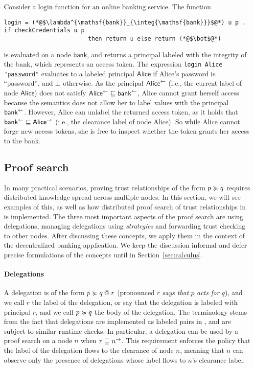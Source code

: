 Consider a login function for an online banking service. The function
\begin{lstlisting}
login = (*@$\lambda^{\mathsf{bank}}_{\integ{\mathsf{bank}}}$@*) u p . if checkCredentials u p
                        then return u else return (*@$\bot$@*)
\end{lstlisting}
is evaluated on a node $\mathsf{bank}$, and returns a principal labeled with the integrity of the bank, which represents an access token. The expression \lstinline[mathescape]!login Alice "password"! evaluates to a labeled principal $\mathsf{Alice}$ if Alice's password is ``password'', and $\bot$ otherwise. As the principal $\integ{\mathsf{Alice}}$ (i.e., the current label of node $\mathsf{Alice}$) does not satisfy $\integ{\mathsf{Alice}} \flowsto \integ{\mathsf{bank}}$, Alice cannot grant herself access because the semantics does not allow her to label values with the principal $\integ{\mathsf{bank}}$.
However, Alice can unlabel the returned access token, as it holds that $\integ{\mathsf{bank}} \flowsto \conf{\mathsf{Alice}}$ (i.e., the clearance label of node Alice). So while Alice cannot forge new access tokens, she is free to inspect whether the token grants her access to the bank.

\subsection{Proof search}
In many practical scenarios, proving trust relationships of the form $p \actsfor q$ requires distributed knowledge spread across multiple nodes. In this section, we will see examples of this, as well as how distributed proof search of trust relationships in \lang{} is implemented. The three most important aspects of the proof search are using delegations, managing delegations using \emph{strategies} and forwarding trust checking to other nodes. After discussing these concepts, we apply them in the context of the decentralized banking application. We keep the discussion informal and defer precise formulations of the concepts until in Section~\ref{sec:calculus}.

\paragraph{Delegations}
A delegation is of the form $\lb{r}{p \actsfor q}$ (pronounced $r$ \emph{says that} $p$ \emph{acts for} $q$), and we call $r$ the label of the delegation, or say that the delegation is labeled with principal $r$, and we call $p \actsfor q$ the body of the delegation. The terminology stems from the fact that delegations are implemented as labeled pairs in \lang, and are subject to similar runtime checks. In particular, a delegation can be used by a proof search on a node $n$ when $r \flowsto \conf{n}$. This requirement enforces the policy that the label of the delegation flows to the clearance of node $n$, meaning that $n$ can observe only the presence of delegations whose label flows to $n$'s clearance label.

